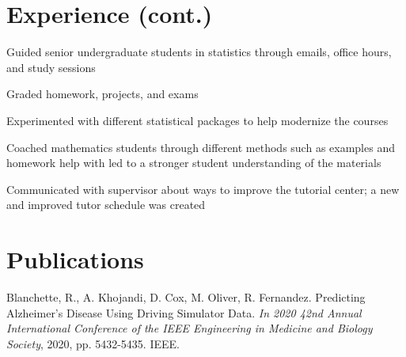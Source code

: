 \documentclass[]{plushcv}
\begin{document}
\begin{minipage}[t]{1.0\textwidth} 


\section{Experience (cont.)}

\vspace{\topsep} %
\begin{tightemize}
\sectionsep
\item Guided senior undergraduate students in statistics through emails, office hours, and study sessions
\item Graded homework, projects, and exams
\item Experimented with different statistical packages to help modernize the courses 
\end{tightemize}
\sectionsep

\begin{tightemize}
\sectionsep
\item Coached mathematics students through different methods such as examples and homework help
with led to a stronger student understanding of the materials
\item Communicated with supervisor about ways to improve the tutorial center; a new and improved
tutor schedule was created
\end{tightemize}
\sectionsep


\section{Publications}

Blanchette, R., A. Khojandi, D. Cox, M. Oliver, R. Fernandez. Predicting Alzheimer’s
Disease Using Driving Simulator Data. \textit{In 2020 42nd Annual International Conference of
the IEEE Engineering in Medicine and Biology Society}, 2020, pp. 5432-5435. IEEE.

\sectionsep

\end{minipage}
\end{document}

